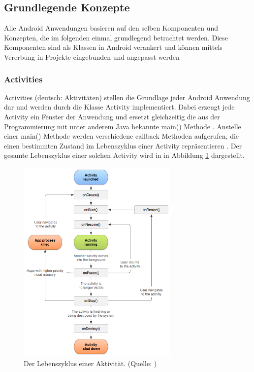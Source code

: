 \subsection{Grundlegende Konzepte}
Alle Android Anwendungen basieren auf den selben Komponenten und Konzepten, die im folgenden einmal grundlegend betrachtet werden. Diese Komponenten sind als Klassen in Android verankert und können mittels Vererbung in Projekte eingebunden und angepasst werden 

\subsubsection{Activities}
Activities (deutsch: \glqq Aktivitäten\grqq ) stellen die Grundlage jeder Android Anwendung dar und werden durch die Klasse Activity implementiert. Dabei erzeugt jede Activity ein Fenster der Anwendung und ersetzt gleichzeitig die aus der Programmierung mit unter anderem Java bekannte main() Methode \citep{android:activities}. Anstelle einer main() Methode werden verschiedene callback Methoden aufgerufen, die einen bestimmten Zustand im Lebenszyklus einer Activity repräsentieren \citep{android:activities}. Der gesamte Lebenszyklus einer solchen Activity wird in in Abbildung \ref{fig:activity-lifecycle} dargestellt. 
\begin{figure}[h!]
\centering
\includegraphics[width=0.7\textwidth]{Abbildungen/activity-lifecycle.png}
\caption[Lebenszyklus einer Aktivität]{Der Lebenszyklus einer Aktivität. (Quelle: \citet{android:activity-lifecycle})}
\label{fig:activity-lifecycle}
\end{figure}\\


